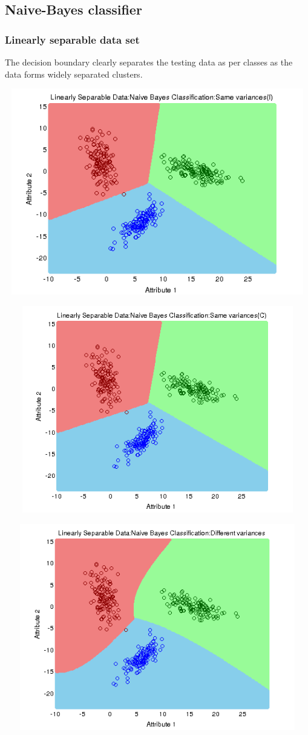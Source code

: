\documentclass[a4paper]{article}
\begin{document}
	
	\subsection{Naive-Bayes classifier}
	\subsubsection{Linearly separable data set}
		The decision boundary clearly separates the testing data as per classes as
		the data forms widely separated clusters.
		
		
	\centerline{\includegraphics[width=160mm,height=90mm]{plots/naivebayes/ls/identity_var.png}}
	\centerline{\includegraphics[width=160mm,height=90mm]{plots/naivebayes/ls/same_var.png}}
	\centerline{\includegraphics[width=160mm,height=90mm]{plots/naivebayes/ls/diff_var.png}}
\end{document}

